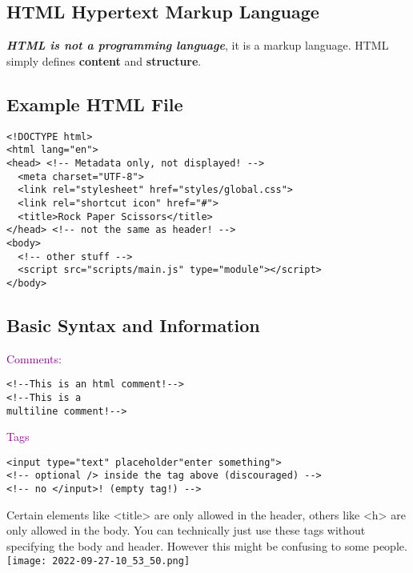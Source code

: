 \documentclass[main.tex,fontsize=6pt,paper=a4,paper=landscape,DIV=calc,]{scrartcl}
\begin{document}
\begin{multicols*}{4}
\section{HTML Hypertext Markup Language}

\textbf{\emph{HTML is not a programming language}}, it is a markup language.\newline
HTML simply defines \textbf{content} and \textbf{structure}.

\subsection{Example HTML File}
\vspace{-2mm}
\begin{lstlisting}
<!DOCTYPE html>
<html lang="en">
<head> <!-- Metadata only, not displayed! -->
  <meta charset="UTF-8">
  <link rel="stylesheet" href="styles/global.css">
  <link rel="shortcut icon" href="#">
  <title>Rock Paper Scissors</title>
</head> <!-- not the same as header! -->
<body>
  <!-- other stuff -->
  <script src="scripts/main.js" type="module"></script>
</body>
\end{lstlisting}
\vspace{2mm}

\subsection{Basic Syntax and Information}
\textcolor{purple}{Comments:}
\vspace{-2mm}
\begin{lstlisting}
<!--This is an html comment!-->
<!--This is a 
multiline comment!-->
\end{lstlisting}
\vspace{2mm}

\textcolor{purple}{Tags}
\vspace{-2mm}
\begin{lstlisting}
<input type="text" placeholder"enter something">
<!-- optional /> inside the tag above (discouraged) -->
<!-- no </input>! (empty tag!) -->
\end{lstlisting}
\vspace{2mm}
Certain elements like <title> are only allowed in the header, others like <h> are only allowed in the body.\newline
You can technically just use these tags without specifying the body and header.\newline
However this might be confusing to some people.
\texttt{[image: 2022-09-27-10\_53\_50.png]}



\end{multicols*}
\end{document}
